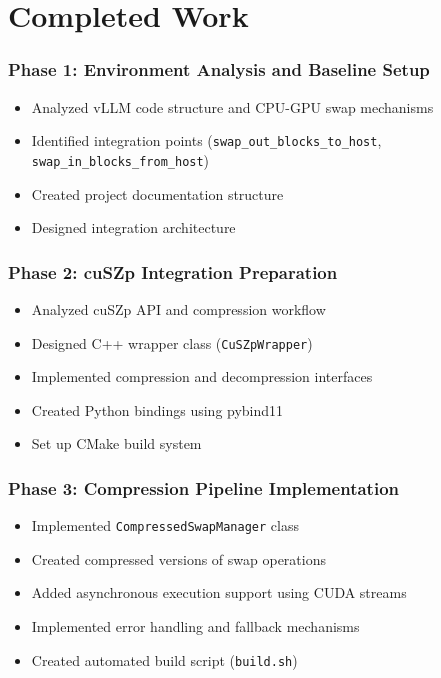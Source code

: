 \documentclass{polyu-comp}
\begin{document}
\chapter{Completed Work}

\subsection{Phase 1: Environment Analysis and Baseline Setup}

\begin{itemize}
    \item Analyzed vLLM code structure and CPU-GPU swap mechanisms
    \item Identified integration points (\texttt{swap\_out\_blocks\_to\_host}, \texttt{swap\_in\_blocks\_from\_host})
    \item Created project documentation structure
    \item Designed integration architecture
\end{itemize}

\subsection{Phase 2: cuSZp Integration Preparation}

\begin{itemize}
    \item Analyzed cuSZp API and compression workflow
    \item Designed C++ wrapper class (\texttt{CuSZpWrapper})
    \item Implemented compression and decompression interfaces
    \item Created Python bindings using pybind11
    \item Set up CMake build system
\end{itemize}

\subsection{Phase 3: Compression Pipeline Implementation}

\begin{itemize}
    \item Implemented \texttt{CompressedSwapManager} class
    \item Created compressed versions of swap operations
    \item Added asynchronous execution support using CUDA streams
    \item Implemented error handling and fallback mechanisms
    \item Created automated build script (\texttt{build.sh})
\end{itemize}
\end{document}
